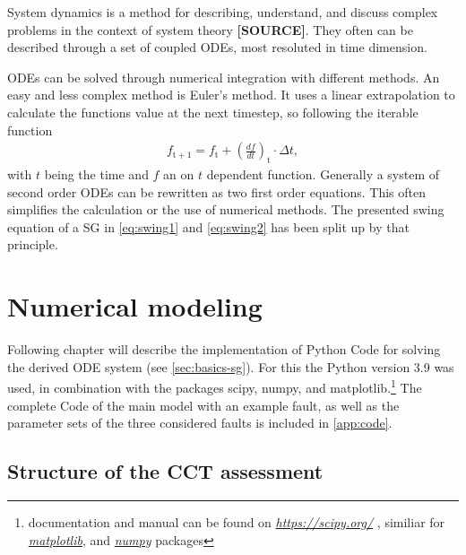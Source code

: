 System dynamics is a method for describing, understand, and discuss complex problems in the context of system theory \textbf{[SOURCE]}. They often can be described through a set of coupled \acfp{ODE}, most resoluted in time dimension. 

\acsp{ODE} can be solved through numerical integration with different methods. An easy and less complex method is Euler's method. It uses a linear extrapolation to calculate the functions value at the next timestep, so following the iterable function
\begin{align}
        f_\mathrm{t+1}=f_\mathrm{t}+\left(\frac{df}{dt}\right)_\mathrm{t} \cdot \Delta t \label{eq:euler},
\end{align}
with $t$ being the time and $f$ an on $t$ dependent function. Generally a system of second order \acsp{ODE} can be rewritten as two first order equations. This often simplifies the calculation or the use of numerical methods. The presented swing equation of a \acs{SG} in \autoref{eq:swing1} and \autoref{eq:swing2} has been split up by that principle.

\chapter{Numerical modeling}
\label{chap:methods}

Following chapter will describe the implementation of Python Code for solving the derived \acs{ODE} system (see \autoref{sec:basics-sg}). For this the Python version 3.9 was used, in combination with the packages scipy, numpy, and matplotlib.\footnote{documentation and manual can be found on \href{https://scipy.org/}{\itshape https://scipy.org/} \autocite{virtanenSciPyFundamentalAlgorithms2020}, similiar for \href{https://matplotlib.org/}{\itshape matplotlib}, and \href{https://numpy.org/}{\itshape numpy} packages} %
The complete Code of the main model with an example fault, as well as the parameter sets of the three considered faults is included in \autoref{app:code}.

\section{Structure of the \acs{CCT} assessment}

